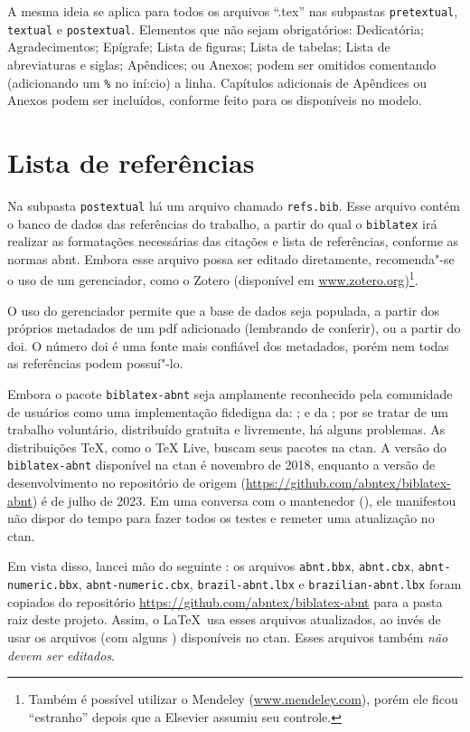 A mesma ideia se aplica para todos os arquivos \enquote{.tex} nas subpastas \texttt{pretextual}, \texttt{textual} e \texttt{postextual}. Elementos que não sejam obrigatórios: Dedicatória; Agradecimentos; Epígrafe; Lista de figuras; Lista de tabelas; Lista de abreviaturas e siglas; Apêndices; ou Anexos; podem ser omitidos comentando (adicionando um \verb|%| no iní:cio) a linha. Capítulos adicionais de Apêndices ou Anexos podem ser incluídos, conforme feito para os disponíveis no modelo.

\section{Lista de referências}

Na subpasta \texttt{postextual} há um arquivo chamado \texttt{refs.bib}. Esse arquivo contém o banco de dados das referências do trabalho, a partir do qual o \texttt{biblatex} irá realizar as formatações necessárias das citações e lista de referências, conforme as normas \ac{abnt}. Embora esse arquivo possa ser editado diretamente, recomenda"-se o uso de um gerenciador, como o Zotero (disponível em \url{www.zotero.org})\footnote{Também é possível utilizar o Mendeley (\url{www.mendeley.com}), porém ele ficou \enquote{estranho} depois que a Elsevier assumiu seu controle.}.

O uso do gerenciador permite que a base de dados seja populada, a partir dos próprios metadados de um \ac{pdf} adicionado (lembrando de conferir), ou a partir do \ac{doi}. O número \ac{doi} é uma fonte mais confiável dos metadados, porém nem todas as referências podem possuí"-lo.

Embora o pacote \texttt{biblatex-abnt} seja amplamente reconhecido pela comunidade de usuários como uma implementação fidedigna da: ; e da ; por se tratar de um trabalho voluntário, distribuído gratuita e livremente, há alguns problemas. As distribuições \TeX, como o TeX Live, buscam seus pacotes na \ac{ctan}. A versão do \texttt{biblatex-abnt} disponível na \ac{ctan} é novembro de 2018, enquanto a versão de desenvolvimento no repositório de origem (\url{https://github.com/abntex/biblatex-abnt}) é de julho de 2023. Em uma conversa com o mantenedor (), ele manifestou não dispor do tempo para fazer todos os testes e remeter uma atualização no \ac{ctan}.

Em vista disso, lancei mão do seguinte : os arquivos \texttt{abnt.bbx}, \texttt{abnt.cbx}, \texttt{abnt-numeric.bbx}, \texttt{abnt-numeric.cbx}, \texttt{brazil-abnt.lbx} e \texttt{brazilian-abnt.lbx} foram copiados do repositório \url{https://github.com/abntex/biblatex-abnt} para a pasta raiz deste projeto. Assim, o \LaTeX\ usa esses arquivos atualizados, ao invés de usar os arquivos (com alguns ) disponíveis no \ac{ctan}. Esses arquivos também \emph{não devem ser editados}.
